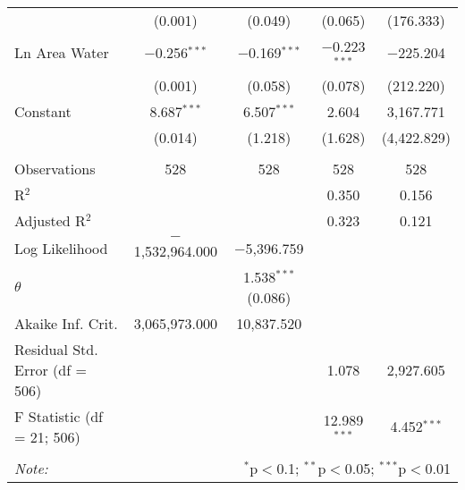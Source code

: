 \begin{table}[!htbp]
\begin{tabular}{@{\extracolsep{5pt}}lcccc}
  & (0.001) & (0.049) & (0.065) & (176.333) \\ 
  Ln Area Water & $-$0.256$^{***}$ & $-$0.169$^{***}$ & $-$0.223$^{***}$ & $-$225.204 \\ 
  & (0.001) & (0.058) & (0.078) & (212.220) \\ 
  Constant & 8.687$^{***}$ & 6.507$^{***}$ & 2.604 & 3,167.771 \\ 
  & (0.014) & (1.218) & (1.628) & (4,422.829) \\ 
 \hline \\[-1.8ex] 
Observations & 528 & 528 & 528 & 528 \\ 
R$^{2}$ &  &  & 0.350 & 0.156 \\ 
Adjusted R$^{2}$ &  &  & 0.323 & 0.121 \\ 
Log Likelihood & $-$1,532,964.000 & $-$5,396.759 &  &  \\ 
$\theta$ &  & 1.538$^{***}$  (0.086) &  &  \\ 
Akaike Inf. Crit. & 3,065,973.000 & 10,837.520 &  &  \\ 
Residual Std. Error (df = 506) &  &  & 1.078 & 2,927.605 \\ 
F Statistic (df = 21; 506) &  &  & 12.989$^{***}$ & 4.452$^{***}$ \\ 
\hline 
\hline \\[-1.8ex] 
\textit{Note:}  & \multicolumn{4}{r}{$^{*}$p$<$0.1; $^{**}$p$<$0.05; $^{***}$p$<$0.01} \\ 
\end{tabular} 
\end{table} 
